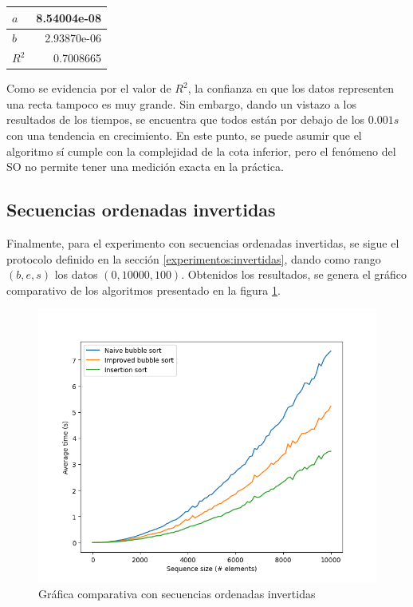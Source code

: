 \documentclass[letter]{article}
\begin{document}
\begin{table}[!ht]
\begin{tabular}{|l|r|}
\hline
$a$ & 8.54004e-08 \\ \hline
$b$ & 2.93870e-06 \\ \hline
$R^2$ & 0.7008665 \\ \hline
\end{tabular}
\end{table}

Como se evidencia por el valor de $R^2$, la confianza en que los datos representen una recta tampoco es muy grande. Sin embargo, dando un vistazo a los resultados de los tiempos, se encuentra que todos están por debajo de los $0.001s$ con una tendencia en crecimiento. En este punto, se puede asumir que el algoritmo sí cumple con la complejidad de la cota inferior, pero el fenómeno del SO no permite tener una medición exacta en la práctica. \par

\subsection{Secuencias ordenadas invertidas} \label{resultados:invertidas}

Finalmente, para el experimento con secuencias ordenadas invertidas, se sigue el protocolo definido en la sección \ref{experimentos:invertidas}, dando como rango $(b,e,s)$ los datos $(0,10000,100)$. Obtenidos los resultados, se genera el gráfico comparativo de los algoritmos presentado en la figura \ref{fig:grafica:invertidas}.

\vspace{-1em}
\begin{figure}[!htb]
\centering
\includegraphics[scale=0.56]{img/plot_reverse_sorted.png}
\vspace{-1em}
\caption{Gráfica comparativa con secuencias ordenadas invertidas}
\label{fig:grafica:invertidas}
\end{figure}
\end{document}
